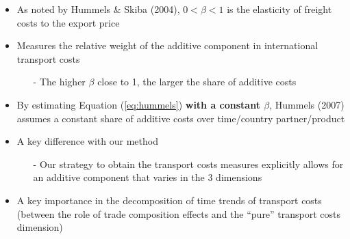 \documentclass[10 pt,Helvetica, french]{beamer}
\begin{document}
\begin{frame}
\begin{itemize}
\item As noted by Hummels \& Skiba (2004), $0<\beta<1$ is the elasticity of freight costs to the export price \vspace{0.1cm}
\item Measures the relative weight of the additive component in international transport costs \vspace{0.1cm}
\begin{itemize}
\item[-] The higher $\beta$ close to 1, the larger the share of additive costs \vspace{0.1cm}
\end{itemize}
\item By estimating Equation (\ref{eq:hummels}) \textbf{with a constant $\beta$}, Hummels (2007) assumes a constant share of additive costs over time/country partner/product \vspace{0.1cm}
\item A key difference with our method \vspace{0.1cm}
\begin{itemize}
\item[-] Our strategy to obtain the transport costs measures explicitly allows for an additive component that varies in the 3 dimensions \vspace{0.1cm}
\end{itemize}
\item A key importance in the decomposition of time trends of transport costs (between the role of trade composition effects and the ``pure'' transport costs dimension)
\end{itemize}
\hyperlink{slide_compeffects_comparison}{}
\end{frame}
\end{document}
